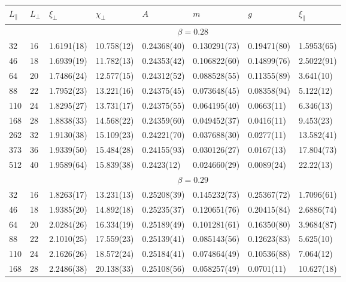 \documentclass[12pt]{article}
\begin{document}
\begin{table}
\tiny  \centering

\begin{tabular}{llllllll}
 \hline 
 \hfil $L_{\|}$ \hfil & \hfil $L_\bot$ \hfil &  \hfil $\xi_\bot$ \hfil & \hfil 
  $\chi_\bot$ \hfil & \hfil $A$ \hfil & \hfil $m$ \hfil & \hfil $g$ \hfil & \hfil 
  $\xi_{\|}$ \hfil  \\ 
 \hline 
 & & \multicolumn{6}{c}{$ \beta = 0.28 $} \\ 
 \hline 
32 & 16 & 1.6191(18) & 10.758(12) & 0.24368(40) & 0.130291(73) & 0.19471(80) & 1.5953(65)\\ 
46 & 18 & 1.6939(19) & 11.782(13) & 0.24353(42) & 0.106822(60) & 0.14899(76) & 2.5022(91)\\ 
64 & 20 & 1.7486(24) & 12.577(15) & 0.24312(52) & 0.088528(55) & 0.11355(89) & 3.641(10)\\ 
88 & 22 & 1.7952(23) & 13.221(16) & 0.24375(45) & 0.073648(45) & 0.08358(94) & 5.122(12)\\ 
110 & 24 & 1.8295(27) & 13.731(17) & 0.24375(55) & 0.064195(40) & 0.0663(11) & 6.346(13)\\ 
168 & 28 & 1.8838(33) & 14.568(22) & 0.24359(60) & 0.049452(37) & 0.0416(11) & 9.453(23)\\ 
262 & 32 & 1.9130(38) & 15.109(23) & 0.24221(70) & 0.037688(30) & 0.0277(11) & 13.582(41)\\ 
373 & 36 & 1.9339(50) & 15.484(28) & 0.24155(93) & 0.030126(27) & 0.0167(13) & 17.804(73)\\ 
512 & 40 & 1.9589(64) & 15.839(38) & 0.2423(12) & 0.024660(29) & 0.0089(24) & 22.22(13)\\ 
\hline 
  & & \multicolumn{6}{c}{$ \beta = 0.29 $} \\ 
 \hline 
32 & 16 & 1.8263(17) & 13.231(13) & 0.25208(39) & 0.145232(73) & 0.25367(72) & 1.7096(61)\\ 
46 & 18 & 1.9385(20) & 14.892(18) & 0.25235(37) & 0.120651(76) & 0.20415(84) & 2.6886(74)\\ 
64 & 20 & 2.0284(26) & 16.334(19) & 0.25189(49) & 0.101281(61) & 0.16350(80) & 3.9684(87)\\ 
88 & 22 & 2.1010(25) & 17.559(23) & 0.25139(41) & 0.085143(56) & 0.12623(83) & 5.625(10)\\ 
110 & 24 & 2.1626(26) & 18.572(24) & 0.25184(41) & 0.074864(49) & 0.10536(88) & 7.064(12)\\ 
168 & 28 & 2.2486(38) & 20.138(33) & 0.25108(56) & 0.058257(49) & 0.0701(11) & 10.627(18)\\ 

\end{tabular}
\end{table}
\end{document}
